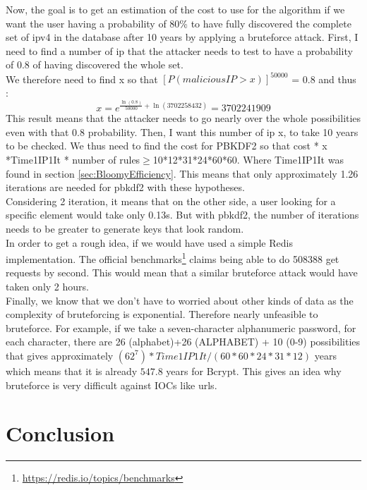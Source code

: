 \documentclass{eplmastersthesis}
\begin{document}
Now, the goal is to get an estimation of the cost to use for the algorithm if we want the user having a probability of 80\% to have fully discovered the complete set of \gls{ipv4} in the database after 10 years by applying a bruteforce attack.
First, I need to find a number of \gls{ip} that the attacker needs to test to have a probability of 0.8 of having discovered the whole set.\\

We therefore need to find x so that $\left[ P(malicious IP > x)\right]^50000$ = 0.8 and thus :
$$x = e^{\frac{\ln(0.8)}{50000} + \ln(3 702 258 432)} = 3702241909$$
This result means that the attacker needs to go nearly over the whole possibilities even with that 0.8 probability.
Then, I want this number of \gls{ip} x, to take 10 years to be checked. We thus need to find the cost for PBKDF2 so that cost * x *Time1IP1It * number of rules$\geq$10*12*31*24*60*60. Where Time1IP1It was found in section \ref{sec:BloomyEfficiency}. This means that only approximately 1.26 iterations are needed for \gls{pbkdf2} with these hypotheses.\\
Considering 2 iteration, it means that on the other side, a user looking for a specific element would take only 0.13s. But with \gls{pbkdf2}, the number of iterations needs to be greater to generate keys that look random.\\

In order to get a rough idea, if we would have used a simple Redis implementation. The official benchmarks\footnote{\url{https://redis.io/topics/benchmarks}} claims being able to do 508388 get requests by second. This would mean that a similar bruteforce attack would have taken only 2 hours.\\

Finally, we know that we don't have to worried about other kinds of data as the complexity of bruteforcing is exponential.
Therefore nearly unfeasible to bruteforce. For example, if we take a seven-character alphanumeric password, for each character, there are 26 (alphabet)+26 (ALPHABET) + 10 (0-9) possibilities that gives approximately $(62^7)*Time1IP1It/(60*60*24*31*12)$ years which means that it is already $547.8$ years for Bcrypt.
This gives an idea why bruteforce is very difficult against IOCs like \glspl{url}.\\ 


\chapter{Conclusion}
\end{document}
